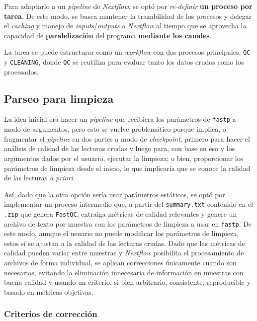 \documentclass[
  letterpaper,
  DIV=11,
  numbers=noendperiod]{scrartcl}
\begin{document}
Para adaptarlo a un \emph{pipeline} de \emph{Nextflow}, se optó por
\emph{re-definir} \textbf{un proceso por tarea}. De este modo, se busca
mantener la trazabilidad de los procesos y delegar el \emph{caching} y
manejo de \emph{inputs}/\emph{outputs} a \emph{Nextflow} al tiempo que
se aprovecha la capacidad de \textbf{paralelización} del programa
\textbf{mediante los canales}.

La tarea se puede estructurar como un \emph{workflow} con dos procesos
principales, \texttt{QC} y \texttt{CLEANING}, donde \texttt{QC} se
reutiliza para evaluar tanto los datos crudos como los procesados.

\subsection{Parseo para limpieza}\label{parseo-para-limpieza}

La idea inicial era hacer un \emph{pipeline} que recibiera los
parámetros de \texttt{fastp} a modo de argumentos, pero esto se vuelve
problemático porque implica, o fragmentar el \emph{pipeline} en dos
partes a modo de \emph{checkpoint}, primero para hacer el análisis de
calidad de las lecturas crudas y luego para, con base en eso y los
argumentos dados por el usuario, ejecutar la limpieza; o bien,
proporcionar los parámetros de limpieza desde el inicio, lo que
implicaría que se conoce la calidad de las lecturas \emph{a priori}.

Así, dado que la otra opción sería usar parámetros estáticos, se optó
por implementar un proceso intermedio que, a partir del
\texttt{summary.txt} contenido en el \texttt{.zip} que genera
\texttt{FastQC}, extraiga métricas de calidad relevantes y genere un
archivo de texto por muestra con los parámetros de limpieza a usar en
\texttt{fastp}. De este modo, aunque el usuario no puede modificar los
parámetros de limpieza, estos sí se ajustan a la calidad de las lecturas
crudas. Dado que las métricas de calidad pueden variar entre muestras y
\emph{Nextflow} posibilita el procesamiento de archivos de forma
individual, se aplican correcciones únicamente cuando son necesarias,
evitando la eliminación innecesaria de información en muestras con buena
calidad y usando un criterio, si bien arbitrario, consistente,
reproducible y basado en métricas objetivas.

\subsubsection{Criterios de
corrección}\label{criterios-de-correcciuxf3n}
\end{document}
